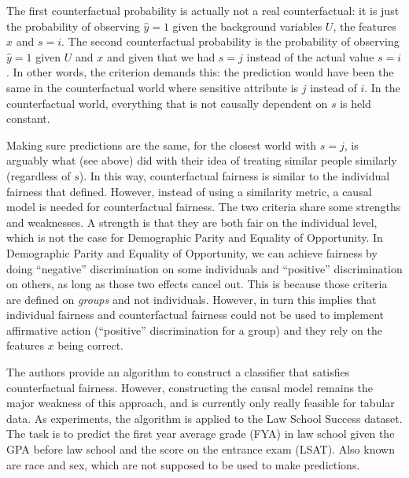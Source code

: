 The first counterfactual probability is actually not a real counterfactual:
it is just the probability of observing \(\hat{y} = 1\)
given the background variables \(U\), the features \(x\) and \(s=i\).
The second counterfactual probability is the probability of observing \(\hat{y} = 1\)
given \(U\) and \(x\) and given that we had \(s=j\) instead of the actual value \(s=i\).
In other words, the criterion demands this:
the prediction would have been the same in the counterfactual world
where sensitive attribute is \(j\) instead of \(i\).
In the counterfactual world, everything that is not causally dependent on \(s\) is held constant.

Making sure predictions are the same, for the closest world with \(s=j\),
is arguably what \citet{dwork2012fairness} (see above) did
with their idea of treating similar people similarly (regardless of \(s\)).
In this way, counterfactual fairness is similar to the individual fairness
that \citet{dwork2012fairness} defined.
However, instead of using a similarity metric,
a causal model is needed for counterfactual fairness.
The two criteria share some strengths and weaknesses.
A strength is that they are both fair on the individual level,
which is not the case for Demographic Parity and Equality of Opportunity.
In Demographic Parity and Equality of Opportunity,
we can achieve fairness by doing ``negative'' discrimination on some individuals
and ``positive'' discrimination on others, as long as those two effects cancel out.
This is because those criteria are defined on \emph{groups} and not individuals.
However, in turn this implies that individual fairness and counterfactual fairness
could not be used to implement affirmative action (``positive'' discrimination for a group)
and they rely on the features \(x\) being correct.

The authors provide an algorithm to construct a classifier that satisfies counterfactual fairness.
However, constructing the causal model remains the major weakness of this approach,
and is currently only really feasible for tabular data.
As experiments, the algorithm is applied to the Law School Success dataset.
The task is to predict the first year average grade (FYA) in law school
given the GPA before law school and the score on the entrance exam (LSAT).
Also known are race and sex, which are not supposed to be used to make predictions.

